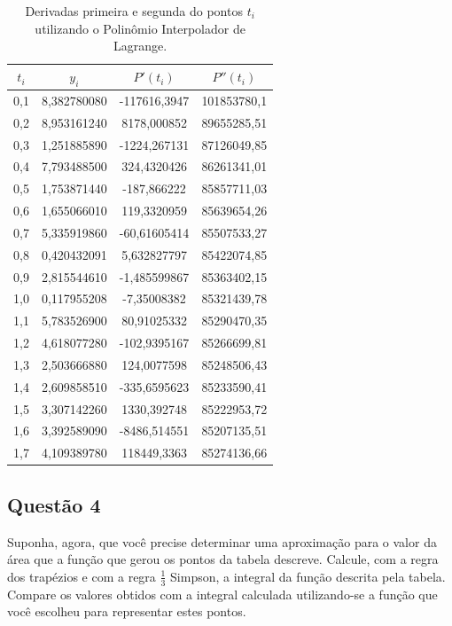 \documentclass[12pt]{article}
\begin{document}
\begin{table}[H]
	\centering
	\begin{tabular}{|c|c|c|c|}
		\hline
		$t_{i}$ & $y_{i}$ & $P'(t_{i})$ & $P''(t_{i})$  \\\hline
		0,1 & 8,382780080 & -117616,3947 & 101853780,1   \\\hline
		0,2 & 8,953161240 & 8178,000852 & 89655285,51  \\\hline
		0,3 & 1,251885890 & -1224,267131 & 87126049,85  \\\hline
		0,4 & 7,793488500 & 324,4320426 & 86261341,01  \\\hline
		0,5 & 1,753871440 & -187,866222 & 85857711,03  \\\hline
		0,6 & 1,655066010 & 119,3320959 & 85639654,26  \\\hline
		0,7 & 5,335919860 & -60,61605414 & 85507533,27  \\\hline
		0,8 & 0,420432091 & 5,632827797 & 85422074,85  \\\hline
		0,9 & 2,815544610 & -1,485599867 & 85363402,15  \\\hline
		1,0 & 0,117955208 & -7,35008382 & 85321439,78  \\\hline
		1,1 & 5,783526900 & 80,91025332 & 85290470,35  \\\hline
		1,2 & 4,618077280 & -102,9395167 & 85266699,81  \\\hline
		1,3 & 2,503666880 & 124,0077598 & 85248506,43  \\\hline
		1,4 & 2,609858510 & -335,6595623 & 85233590,41  \\\hline
		1,5 & 3,307142260 & 1330,392748 & 85222953,72  \\\hline
		1,6 & 3,392589090 & -8486,514551 & 85207135,51  \\\hline
		1,7 & 4,109389780 & 118449,3363 & 85274136,66  \\\hline
	\end{tabular}
	\caption{Derivadas primeira e segunda do pontos $t_{i}$ utilizando o Polinômio Interpolador de Lagrange.}
	\label{tab:tipil}
\end{table}

\subsection{Questão 4}
\label{subsec:p1q4}

Suponha, agora, que você precise determinar uma aproximação para o valor da área que a função que gerou os pontos da tabela descreve. Calcule, com a regra dos trapézios e com a regra $\frac{1}{3}$ Simpson, a integral da função descrita pela tabela. Compare os valores obtidos com a integral calculada utilizando-se a função que você escolheu para representar estes pontos.
\end{document}
